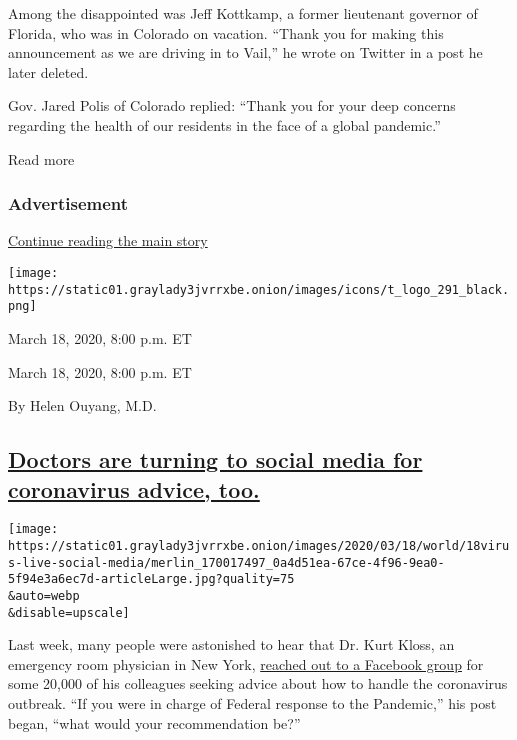 Among the disappointed was Jeff Kottkamp, a former lieutenant governor
of Florida, who was in Colorado on vacation. ``Thank you for making this
announcement as we are driving in to Vail,'' he wrote on Twitter in a
post he later deleted.

Gov. Jared Polis of Colorado replied: ``Thank you for your deep concerns
regarding the health of our residents in the face of a global
pandemic.''

Read more

\hypertarget{advertisement}{%
\subsubsection{Advertisement}\label{advertisement}}

\protect\hyperlink{after-dfp-ad-mid1}{Continue reading the main story}

\texttt{[image: https://static01.graylady3jvrrxbe.onion/images/icons/t\_logo\_291\_black.png]}

March 18, 2020, 8:00 p.m. ET

March 18, 2020, 8:00 p.m. ET

By Helen Ouyang, M.D.

\hypertarget{doctors-are-turning-to-social-media-for-coronavirus-advice-too}{%
\subsection{\texorpdfstring{\protect\hyperlink{doctors-are-turning-to-social-media-for-coronavirus-advice-too}{Doctors
are turning to social media for coronavirus advice,
too.}}{Doctors are turning to social media for coronavirus advice, too.}}\label{doctors-are-turning-to-social-media-for-coronavirus-advice-too}}

\texttt{[image: https://static01.graylady3jvrrxbe.onion/images/2020/03/18/world/18virus-live-social-media/merlin\_170017497\_0a4d51ea-67ce-4f96-9ea0-5f94e3a6ec7d-articleLarge.jpg?quality=75\\\&auto=webp\\\&disable=upscale]}

Last week, many people were astonished to hear that Dr. Kurt Kloss, an
emergency room physician in New York,
\href{https://www.nytimes3xbfgragh.onion/2020/03/13/us/politics/coronavirus-jared-kushner-kloss.html}{reached
out to a Facebook group} for some 20,000 of his colleagues seeking
advice about how to handle the coronavirus outbreak. ``If you were in
charge of Federal response to the Pandemic,'' his post began, ``what
would your recommendation be?''

